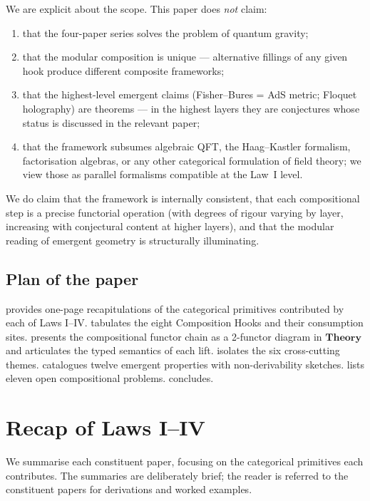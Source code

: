 \documentclass[12pt]{article}
\theoremstyle{definition}
\theoremstyle{remark}
\newcommand{\Theory}{\mathbf{Theory}}
\begin{document}
We are explicit about the scope. This paper does \emph{not} claim:
\begin{enumerate}[label=(\roman*), leftmargin=2.4em]
  \item that the four-paper series solves the problem of quantum gravity;
  \item that the modular composition is unique --- alternative fillings of any
    given hook produce different composite frameworks;
  \item that the highest-level emergent claims (Fisher--Bures = AdS metric;
    Floquet holography) are theorems --- in the highest layers they are
    conjectures whose status is discussed in the relevant paper;
  \item that the framework subsumes algebraic QFT, the Haag--Kastler
    formalism, factorisation algebras, or any other categorical formulation of
    field theory; we view those as parallel formalisms compatible at the
    Law~I level.
\end{enumerate}
We do claim that the framework is internally consistent, that each
compositional step is a precise functorial operation (with degrees of rigour
varying by layer, increasing with conjectural content at higher layers), and
that the modular reading of emergent geometry is structurally illuminating.

\subsection{Plan of the paper}

 provides one-page recapitulations of the categorical
primitives contributed by each of Laws I--IV.  tabulates
the eight Composition Hooks and their consumption sites.
 presents the compositional functor chain as a
2-functor diagram in $\Theory$ and articulates the typed semantics of each
lift.  isolates the six cross-cutting themes.
 catalogues twelve emergent properties with
non-derivability sketches.  lists eleven open compositional
problems.  concludes.

\section{Recap of Laws I--IV}
\label{sec:recap}

We summarise each constituent paper, focusing on the categorical primitives
each contributes. The summaries are deliberately brief; the reader is
referred to the constituent papers for derivations and worked examples.
\end{document}
